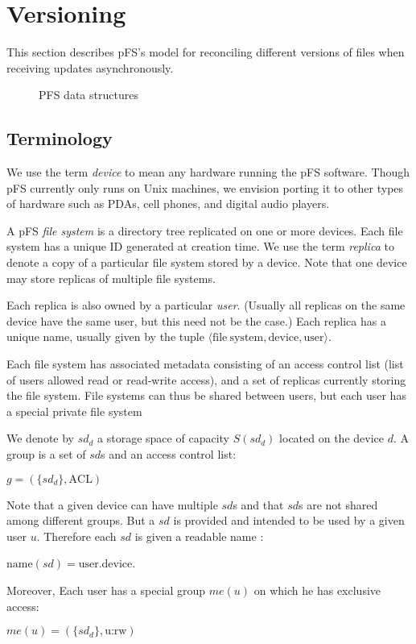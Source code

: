 
\section{Versioning}
\label{sec:vers}

This section describes pFS's model for reconciling different versions
of files when receiving updates asynchronously.

\begin{figure*}
\centerline{}
\caption{PFS data structures}
\label{fig:struct}
\end{figure*}

\subsection{Terminology}

We use the term \emph{device} to mean any hardware running the pFS
software.  Though pFS currently only runs on Unix machines, we
envision porting it to other types of hardware such as PDAs, cell
phones, and digital audio players.

A pFS \emph{file system} is a directory tree replicated on one or more
devices.  Each file system has a unique ID generated at creation time.
We use the term \emph{replica} to denote a copy of a particular file
system stored by a device.  Note that one device may store replicas of
multiple file systems.

Each replica is also owned by a particular \emph{user}.  (Usually all
replicas on the same device have the same user, but this need not be
the case.)  Each replica has a unique name, usually given by the
tuple $\langle \mathrm{file\ system}, \mathrm{device}, \mathrm{user}\rangle$.

Each file system has associated metadata consisting of an access
control list (list of users allowed read or read-write access), and a
set of replicas currently storing the file system.  File systems can
thus be shared between users, but each user has a special private file
system

We denote by $sd_{d}$ a storage space of capacity $S(sd_{d})$
located on the device $d$. A group is a set of $sd$s and an
access control list:
\begin{center}
$g = (\{sd_{d}\}, \text{ACL})$
\end{center}
Note that a given device can have multiple $sd$s and that $sd$s are
not shared among different groups. But a $sd$ is provided and intended
to be used by a given user $u$. Therefore each $sd$ is given a
readable name :
\begin{center}
$\text{name}(sd) = \text{user}.\text{device}$. 
\end{center}
Moreover, Each user has a special group $me(u)$ on which he has
exclusive access:
\begin{center}
$me(u) = (\{sd_{d}\}, \text{u:rw})$
\end{center}


